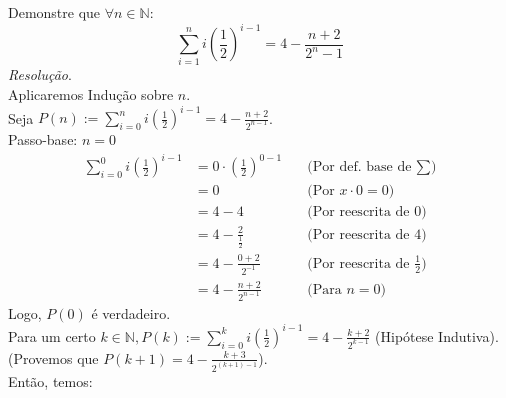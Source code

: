 Demonstre que $\forall n \in \mathbb{N}$:
\begin{displaymath}
	\sum\limits_{i = 1}^n i(\frac{1}{2})^{i - 1} = 4 - \frac{n + 2}{2^n - 1}
\end{displaymath}
\emph{Resolução}. \\
Aplicaremos Indução sobre $n$. \\
Seja $P(n) := \sum\limits_{i = 0}^n i(\frac{1}{2})^{i - 1} = 4 - \frac{n + 2}{2^{n - 1}}$. \\
Passo-base: $n = 0$
\begin{align*}
	\sum\limits_{i = 0}^0 i(\frac{1}{2})^{i - 1} & = 0 \cdot (\frac{1}{2})^{0 - 1} & \quad \text{(Por def. base de $\sum$)}        \\
	                                             & = 0                             & \quad \text{(Por $x \cdot 0 = 0$)}            \\
	                                             & = 4 - 4                         & \quad \text{(Por reescrita de 0)}             \\
	                                             & = 4 - \frac{2}{\frac{1}{2}}     & \quad \text{(Por reescrita de 4)}             \\
	                                             & = 4 - \frac{0 + 2}{2^{-1}}      & \quad \text{(Por reescrita de $\frac{1}{2}$)} \\
	                                             & = 4 - \frac{n + 2}{2^{n - 1}}   & \quad \text{(Para $n = 0$)}
\end{align*}
Logo, $P(0)$ é verdadeiro. \\
Para um certo $k \in \mathbb{N}, P(k) := \sum\limits_{i = 0}^k i(\frac{1}{2})^{i - 1} = 4 - \frac{k + 2}{2^{k - 1}}$ (Hipótese Indutiva). \\
(Provemos que $P(k + 1) = 4 - \frac{k + 3}{2^{(k + 1) - 1}}$). \\
Então, temos:
